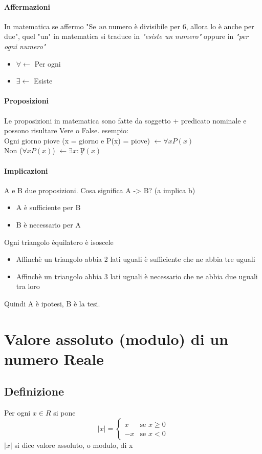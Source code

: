 \documentclass[12pt, a4paper, openany]{book}
\begin{document}
\paragraph*{Affermazioni} In matematica se affermo "Se \emph{un} numero è divisibile per 6, allora lo è anche per due", quel "un" in matematica si traduce in \emph{"esiste un numero"} oppure in \emph{"per ogni numero"} 
\begin{itemize}
    \item $\forall \leftarrow$ Per ogni
    \item $\exists \leftarrow$ Esiste
\end{itemize}

\paragraph*{Proposizioni}
Le proposizioni in matematica sono fatte da soggetto + predicato nominale e possono risultare Vere o False.
esempio: 
\\Ogni giorno piove (x = giorno e P(x) = piove) $\leftarrow \forall x P(x)$
\\Non ($\forall x P(x)$) $\leftarrow \exists x : \not P(x)$

\paragraph*{Implicazioni}
A e B due proposizioni. Cosa significa A -> B? (a implica b)
\begin{itemize}
    \item A è sufficiente per B
    \item B è necessario per A
\end{itemize}
Ogni triangolo èquilatero è isoscele
\begin{itemize}
    \item Affinchè un triangolo abbia 2 lati uguali è sufficiente che ne abbia tre uguali
    \item Affinchè un triangolo abbia 3 lati uguali è necessario che ne abbia due uguali tra loro
\end{itemize}
Quindi A è ipotesi, B è la tesi.

\section{Valore assoluto (modulo) di un numero Reale}
\subsection{Definizione} Per ogni $x \in R$ si pone
\begin{equation}
    |x| = \begin{cases}
        x & \text{se $x \geq 0$}\\
        -x & \text{se $x < 0$}
    \end{cases}
\end{equation}
$|x|$ si dice valore assoluto, o modulo, di x\\
\end{document}
